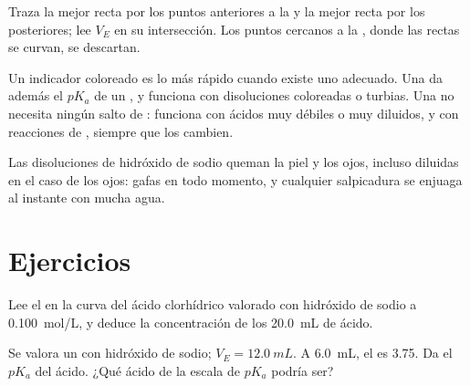 \begin{method}\label{met:g12:ph-conductivity-titrations:two-lines}
Traza la mejor recta por los puntos anteriores a la  y la
mejor recta por los posteriores; lee $V_E$ en su intersección. Los
puntos cercanos a la , donde las rectas se curvan, se
descartan.
\end{method}

\begin{remark}\label{rem:g12:ph-conductivity-titrations:which}
Un indicador coloreado es lo más rápido cuando existe uno adecuado. Una
 da además el $pK_a$ de un , y funciona
con disoluciones coloreadas o turbias. Una  no
necesita ningún salto de : funciona con ácidos muy débiles o muy
diluidos, y con reacciones de , siempre que los 
cambien.
\end{remark}

\begin{safety}{}
Las disoluciones de hidróxido de sodio queman la piel y los ojos, incluso
diluidas en el caso de los ojos: gafas en todo momento, y cualquier
salpicadura se enjuaga al instante con mucha agua.
\end{safety}

\section{Ejercicios}


\begin{exercise}[$\star$]\label{exo:g12:ph-conductivity-titrations:1}
Lee el  en la curva del ácido clorhídrico valorado
con hidróxido de sodio a \qty{0.100}{mol/L}, y deduce la concentración
de los \qty{20.0}{mL} de ácido.
\end{exercise}

\begin{exercise}[$\star$]\label{exo:g12:ph-conductivity-titrations:2}
Se valora un  con hidróxido de sodio; $V_E = \qty{12.0}{mL}$.
A \qty{6.0}{mL}, el  es 3.75. Da el $pK_a$ del ácido. ¿Qué ácido de la
escala de $pK_a$ podría ser?
\end{exercise}

